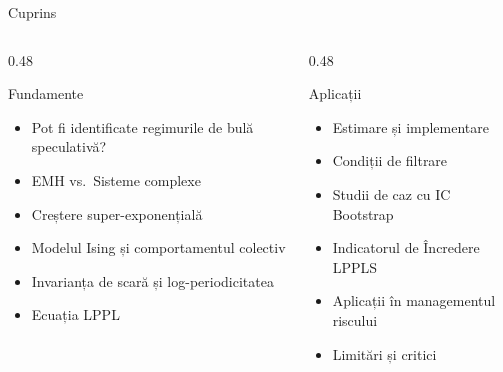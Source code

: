 \documentclass[9pt, aspectratio=169, t]{beamer}
\begin{document}
\begin{frame}{Cuprins}
    \vspace{-0.3cm}
    {\small
    \begin{columns}[T]
        \begin{column}{0.48\textwidth}
            \begin{block}{Fundamente}
                \begin{itemize}\setlength{\itemsep}{3pt}
                    \item Pot fi identificate regimurile de bulă speculativă?
                    \item EMH vs.\ Sisteme complexe
                    \item Creștere super-exponențială
                    \item Modelul Ising și comportamentul colectiv
                    \item Invarianța de scară și log-periodicitatea
                    \item Ecuația LPPL
                \end{itemize}
            \end{block}
        \end{column}
        \begin{column}{0.48\textwidth}
            \begin{exampleblock}{Aplicații}
                \begin{itemize}\setlength{\itemsep}{3pt}
                    \item Estimare și implementare
                    \item Condiții de filtrare
                    \item Studii de caz cu IC Bootstrap
                    \item Indicatorul de Încredere LPPLS
                    \item Aplicații în managementul riscului
                    \item Limitări și critici
                \end{itemize}
            \end{exampleblock}
        \end{column}
    \end{columns}
    }
\end{frame}

\end{document}
